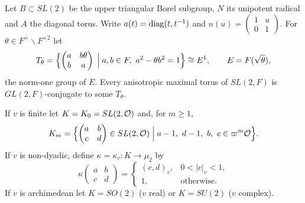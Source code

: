 Let $B\subset SL(2)$ be the upper triangular Borel subgroup, $N$ its
unipotent radical and $A$ the diagonal torus. Write
$a(t)=\operatorname{diag}(t,t^{-1})$ and $n(u)=\begin{pmatrix}1&u\\0&1\end{pmatrix}$.
For $\theta\in F^\times\smallsetminus F^{\times2}$ let
\[
T_\theta=\Bigl\{\begin{pmatrix}a&b\theta\\b&a\end{pmatrix}
\;\Big|\;a,b\in F,\ a^2-\theta b^2=1\Bigr\}\cong E^1,
\qquad E=F(\sqrt\theta),
\]
the norm-one group of $E$. Every anisotropic maximal torus of
$SL(2,F)$ is $GL(2,F)$-conjugate to some $T_\theta$.

If $v$ is finite let $K=K_0=SL(2,\mathcal{O})$ and, for $m\ge1$,
\[
K_m=\Bigl\{\begin{pmatrix}a&b\\c&d\end{pmatrix}\in SL(2,\mathcal{O})
\;\Big|\;a-1,\ d-1,\ b,\ c\in\varpi^m\mathcal{O}\Bigr\}.
\]
If $v$ is non-dyadic, define $\kappa=\kappa_v\colon K\to\mu_2$ by
\begin{equation}\label{eq:kappa}
\kappa\begin{pmatrix}a&b\\c&d\end{pmatrix}
=\begin{cases}(c,d)_v,&0<|c|_v<1,\\ 1,&\text{otherwise.}\end{cases}
\end{equation}
If $v$ is archimedean let $K=SO(2)$ ($v$ real) or $K=SU(2)$
($v$ complex).

